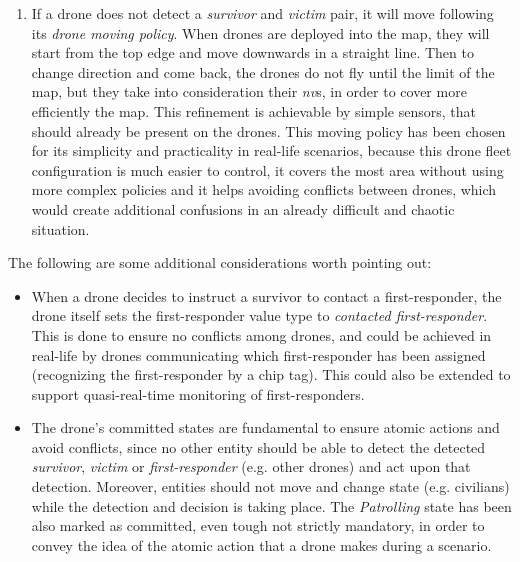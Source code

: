 \begin{enumerate}
\begin{enumerate}
		\item If a drone does not detect a \textit{survivor} and \textit{victim} pair, it will move following its \textit{drone moving policy}. When drones are deployed into the map, they will start from the top edge and move downwards in a straight line. Then to change direction and come back, the drones do not fly until the limit of the map, but they take into consideration their \textit{nv}s, in order to cover more efficiently the map. This refinement is achievable by simple sensors, that should already be present on the drones. This moving policy has been chosen for its simplicity and practicality in real-life scenarios, because this drone fleet configuration is much easier to control, it covers the most area without using more complex policies and it helps avoiding conflicts between drones, which would create additional confusions in an already difficult and chaotic situation.\newline
	\end{enumerate}
	
	The following are some additional considerations worth pointing out:
	\begin{itemize}
		\item 	When a drone decides to instruct a survivor to contact a first-responder, the drone itself sets the first-responder value type to \textit{contacted first-responder}. This is done to ensure no conflicts among drones, and could be achieved in real-life by drones communicating which first-responder has been assigned (recognizing the first-responder by a chip tag). This could also be extended to support quasi-real-time monitoring of first-responders.
		\item 	The drone's committed states are fundamental to ensure atomic actions and avoid conflicts, since no other entity should be able to detect the detected \textit{survivor}, \textit{victim} or \textit{first-responder} (e.g. other drones) and act upon that detection. Moreover, entities should not move and change state (e.g. civilians) while the detection and decision is taking place. The \textit{Patrolling} state has been also marked as committed, even tough not strictly mandatory, in order to convey the idea of the atomic action that a drone makes during a scenario.
	\end{itemize}
\end{enumerate}

